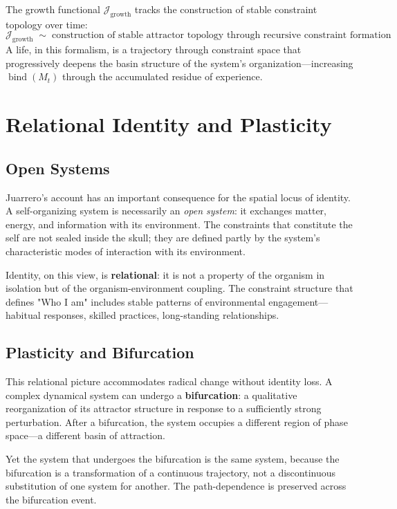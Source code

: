 \documentclass[11pt]{article}
\newcommand{\bind}{\operatorname{bind}}
\newcommand{\Jgrowth}{\mathcal{J}_{\mathrm{growth}}}
\begin{document}
The growth functional $\Jgrowth$ tracks the construction of stable constraint topology
over time:
\[
\Jgrowth \;\sim\; \text{construction of stable attractor topology through recursive constraint formation}
\]
A life, in this formalism, is a trajectory through constraint space that progressively
deepens the basin structure of the system's organization—increasing $\bind(M_t)$ through
the accumulated residue of experience.

\section{Relational Identity and Plasticity}

\subsection{Open Systems}

Juarrero's account has an important consequence for the spatial locus of identity. A
self-organizing system is necessarily an \emph{open system}: it exchanges matter, energy,
and information with its environment. The constraints that constitute the self are not
sealed inside the skull; they are defined partly by the system's characteristic modes of
interaction with its environment.

Identity, on this view, is \textbf{relational}: it is not a property of the organism in
isolation but of the organism-environment coupling. The constraint structure that defines
"Who I am" includes stable patterns of environmental engagement—habitual responses,
skilled practices, long-standing relationships.

\subsection{Plasticity and Bifurcation}

This relational picture accommodates radical change without identity loss. A complex
dynamical system can undergo a \textbf{bifurcation}: a qualitative reorganization of its
attractor structure in response to a sufficiently strong perturbation. After a bifurcation,
the system occupies a different region of phase space—a different basin of attraction.

Yet the system that undergoes the bifurcation is the same system, because the bifurcation
is a transformation of a continuous trajectory, not a discontinuous substitution of one
system for another. The path-dependence is preserved across the bifurcation event.
\end{document}
